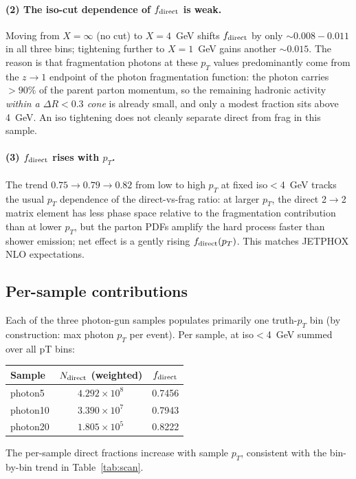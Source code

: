 \documentclass[11pt,a4paper]{article}
\begin{document}
\paragraph{(2) The iso-cut dependence of $f_{\rm direct}$ is weak.}  Moving from $X=\infty$ (no cut) to $X=4$~GeV shifts $f_{\rm direct}$ by only $\sim 0.008{-}0.011$ in all three bins; tightening further to $X=1$~GeV gains another $\sim 0.015$.  The reason is that fragmentation photons at these $p_T$ values predominantly come from the $z\to 1$ endpoint of the photon fragmentation function: the photon carries $>\!90\%$ of the parent parton momentum, so the remaining hadronic activity \emph{within a $\Delta R<0.3$ cone} is already small, and only a modest fraction sits above 4~GeV.  An iso tightening does not cleanly separate direct from frag in this sample.

\paragraph{(3) $f_{\rm direct}$ rises with $p_T$.}  The trend $0.75\to 0.79\to 0.82$ from low to high $p_T$ at fixed iso$<$4~GeV tracks the usual $p_T$ dependence of the direct-vs-frag ratio: at larger $p_T$, the direct 2$\to$2 matrix element has less phase space relative to the fragmentation contribution than at lower $p_T$, but the parton PDFs amplify the hard process faster than shower emission; net effect is a gently rising $f_{\rm direct}(p_T)$.  This matches JETPHOX NLO expectations.

\subsection{Per-sample contributions}
\label{sec:results:persamp}

Each of the three photon-gun samples populates primarily one truth-$p_T$ bin (by construction: max photon $p_T$ per event).  Per sample, at iso$<$4~GeV summed over all pT bins:
\begin{center}
\begin{tabular}{lcc}
\toprule
Sample & $N_{\rm direct}$ (weighted) & $f_{\rm direct}$ \\
\midrule
photon5  & $4.292\times 10^{8}$ & 0.7456 \\
photon10 & $3.390\times 10^{7}$ & 0.7943 \\
photon20 & $1.805\times 10^{5}$ & 0.8222 \\
\bottomrule
\end{tabular}
\end{center}
The per-sample direct fractions increase with sample $p_T$, consistent with the bin-by-bin trend in Table~\ref{tab:scan}.
\end{document}
